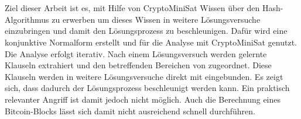 \section*{\abstractname}

Ziel dieser Arbeit ist es, mit Hilfe von CryptoMiniSat Wissen über den Hash-Algorithmus 
zu erwerben um dieses Wissen in weitere Lösungsversuche einzubringen und damit den Lösungsprozess zu
beschleunigen. Dafür wird eine konjunktive Normalform erstellt und für die Analyse mit CryptoMiniSat genutzt.
Die Analyse erfolgt iterativ. Nach einem Lösungsversuch werden gelernte Klauseln extrahiert und den
betreffenden Bereichen von  zugeordnet. Diese Klauseln werden in weitere Lösungsversuche direkt
mit eingebunden. Es zeigt sich, dass dadurch der Lösungsprozess beschleunigt werden kann. Ein praktisch
relevanter Angriff ist damit jedoch nicht möglich. Auch die Berechnung eines Bitcoin-Blocks lässt sich
damit nicht ausreichend schnell durchführen.